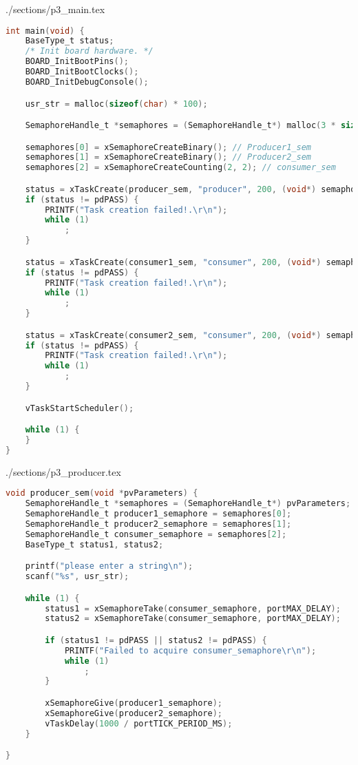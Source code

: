 \begin{filecontents}[overwrite]{./sections/p3_main.tex}
\begin{lstlisting}[language=c,caption=Problem 3 main, label=list:p3_main]
int main(void) {
    BaseType_t status;
    /* Init board hardware. */
    BOARD_InitBootPins();
    BOARD_InitBootClocks();
    BOARD_InitDebugConsole();

    usr_str = malloc(sizeof(char) * 100);

    SemaphoreHandle_t *semaphores = (SemaphoreHandle_t*) malloc(3 * sizeof(SemaphoreHandle_t));

    semaphores[0] = xSemaphoreCreateBinary(); // Producer1_sem
    semaphores[1] = xSemaphoreCreateBinary(); // Producer2_sem
    semaphores[2] = xSemaphoreCreateCounting(2, 2); // consumer_sem

    status = xTaskCreate(producer_sem, "producer", 200, (void*) semaphores, 2, NULL);
    if (status != pdPASS) {
        PRINTF("Task creation failed!.\r\n");
        while (1)
            ;
    }

    status = xTaskCreate(consumer1_sem, "consumer", 200, (void*) semaphores, 2, NULL);
    if (status != pdPASS) {
        PRINTF("Task creation failed!.\r\n");
        while (1)
            ;
    }

    status = xTaskCreate(consumer2_sem, "consumer", 200, (void*) semaphores, 3, NULL);
    if (status != pdPASS) {
        PRINTF("Task creation failed!.\r\n");
        while (1)
            ;
    }

    vTaskStartScheduler();

    while (1) {
    }
}
\end{lstlisting}
\end{filecontents}

\begin{filecontents}[overwrite]{./sections/p3_producer.tex}
\begin{lstlisting}[language=c,caption=Problem 3 Producer Task, label=list:p3_prod]
void producer_sem(void *pvParameters) {
    SemaphoreHandle_t *semaphores = (SemaphoreHandle_t*) pvParameters;
    SemaphoreHandle_t producer1_semaphore = semaphores[0];
    SemaphoreHandle_t producer2_semaphore = semaphores[1];
    SemaphoreHandle_t consumer_semaphore = semaphores[2];
    BaseType_t status1, status2;

    printf("please enter a string\n");
    scanf("%s", usr_str);

    while (1) {
        status1 = xSemaphoreTake(consumer_semaphore, portMAX_DELAY);
        status2 = xSemaphoreTake(consumer_semaphore, portMAX_DELAY);

        if (status1 != pdPASS || status2 != pdPASS) {
            PRINTF("Failed to acquire consumer_semaphore\r\n");
            while (1)
                ;
        }

        xSemaphoreGive(producer1_semaphore);
        xSemaphoreGive(producer2_semaphore);
        vTaskDelay(1000 / portTICK_PERIOD_MS);
    }

}    
\end{lstlisting}
\end{filecontents}


